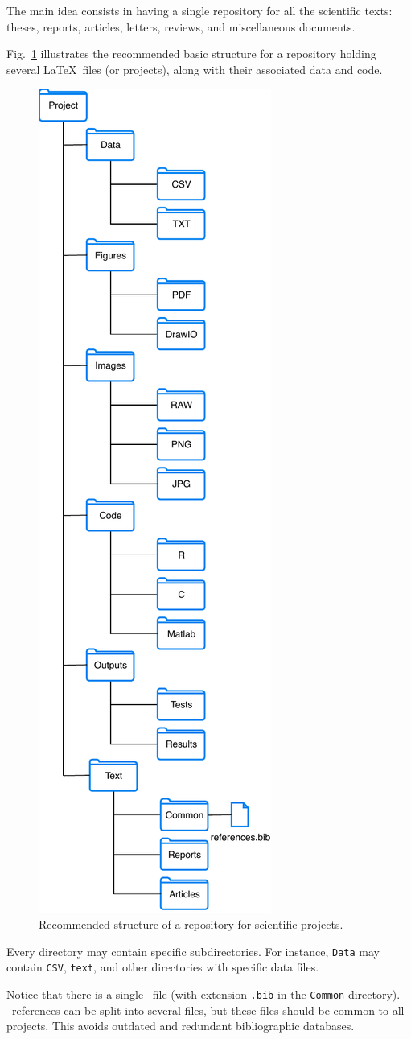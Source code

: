 \documentclass[journal,twoside]{IEEEtran}
\begin{document}
The main idea consists in having a single repository for all the scientific texts: 
theses, 
reports, 
articles, 
letters,
reviews,
and miscellaneous documents.

Fig.~\ref{Fig:StructRepo} illustrates the recommended basic structure for a repository holding several \LaTeX\ files (or projects), along with their associated data and code.

\begin{figure}[hbt]
	\centering
	\includegraphics[width=.35\columnwidth]{DirectoryStructure}
	\caption{Recommended structure of a repository for scientific projects.}\label{Fig:StructRepo}
\end{figure}

Every directory may contain specific subdirectories.
For instance, \verb|Data| may contain \verb|CSV|, \verb|text|, and other directories with specific data files.

Notice that there is a single \BibTeX\ file (with extension \verb|.bib| in the \verb|Common| directory).
\BibTeX\ references can be split into several files, but these files should be common to all projects.
This avoids outdated and redundant bibliographic databases.
\end{document}
